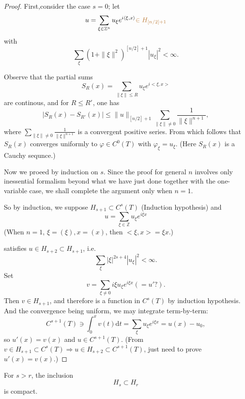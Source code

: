 \documentclass[twoside,openany,12pt]{beautynote}
\newcommand{\mathd}{\mathrm{d}}
\newcommand{\tmcolor}[2]{{\color{#1}{#2}}}
\begin{document}
\begin{proof}
  First,consider the case $s = 0$; let
  \[ u = \sum_{\xi \in \mathbb{Z}^n} u_{\xi} e^{i \langle \xi, x \rangle}
     \tmcolor{brown}{\in H_{[n / 2] + 1}} \]
  with
  \[  \sum_{\xi} (1 +\| \xi \|^2 )^{[n / 2] + 1} | u_{\xi} |^2 < \infty . \]
  
  
  Observe that the partial sums
  \[ S_R (x) = \sum_{\| \xi \| \leqslant R} u_{\xi} e^{i < \xi, x >} \]
  are continous, and for ${R \leqslant R'}^{}$, one has
  \[  | S_R (x) - S_{R'} (x) | \leqslant \|u\|_{[n / 2] + 1} \sum_{\| \xi \|
     \neq 0} \frac{1}{\| \xi \|^{n + 1}}, \]
  where $\sum_{\| \xi \| \neq 0} \frac{1}{\| \xi \|^{n + 1}}$ is a convergent
  positive series. From which follows that $S_R (x)$ converges uniformly to
  $\varphi \in C^0 (T)$ with $\varphi_{\xi} = u_{\xi}$. (Here $S_R (x)$ is a
  Cauchy sequnce.)
  
  Now we proeed by induction on $s$. Since the proof for general $n$ involves
  only inessential formalism beyond what we have just done together with the
  one-variable case, we shall complete the argument only when $n = 1$.
  
  So by induction, we suppose $H_{s + 1} \subset C^s (T)$ (Induction
  hypothesis) and
  \[ u = \sum_{\xi \in \mathbb{Z}} u_{\xi} e^{i \xi x} \]
  (When $n = 1$, $\xi = (\xi), x = (x)$, then $< \xi, x > = \xi x$.)
  
  satisfies $u \in H_{s + 2} \subset H_{s + 1}$, i.e.
  \[  \sum_{\xi} | \xi |^{2 s + 4} | u_{\xi} |^2 < \infty . \]
  Set
  \[ v = \sum_{\xi \neq 0} i \xi u_{\xi} e^{i \xi x}  (= u' ?) . \]
  Then $v \in H_{s + 1}$, and therefore is a function in $C^s (T)$ by
  induction hypothesis. And the convergence being uniform, we may integrate
  term-by-term:
  \[ C^{s + 1} (T) \ni \int_0^x v (t) \mathd t = \sum_{\xi} u_{\xi} e^{i \xi
     x} = u (x) - u_0, \]
  so $u' (x) = v (x)$ and $u \in C^{s + 1} (T)$. (From $v \in H_{s + 1}
  \subset C^s (T) \Longrightarrow u \in H_{s + 2} \subset C^{s + 1} (T)$, just
  need to prove $u' (x) = v (x) .$)
  
  
\end{proof}

\begin{lemma}
  For $s > r$, the inclusion
  \[ H_s \subset H_r \]
  is compact.
\end{lemma}
\end{document}
